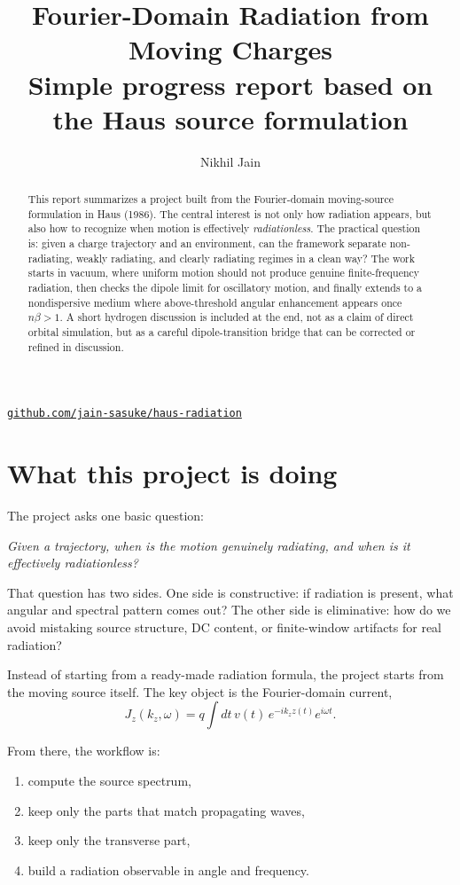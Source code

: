 \documentclass[11pt]{article}
\title{\textbf{Fourier-Domain Radiation from Moving Charges}\\[0.3em]
\large Simple progress report based on the Haus source formulation}
\author{Nikhil Jain}
\date{}
\begin{document}
\maketitle

\begin{center}
\href{https://github.com/jain-sasuke/haus-radiation}{\texttt{github.com/jain-sasuke/haus-radiation}}
\end{center}

\begin{abstract}
This report summarizes a project built from the Fourier-domain moving-source formulation in Haus (1986). The central interest is not only how radiation appears, but also how to recognize when motion is effectively \textit{radiationless}. The practical question is: given a charge trajectory and an environment, can the framework separate non-radiating, weakly radiating, and clearly radiating regimes in a clean way? The work starts in vacuum, where uniform motion should not produce genuine finite-frequency radiation, then checks the dipole limit for oscillatory motion, and finally extends to a nondispersive medium where above-threshold angular enhancement appears once $n\beta>1$. A short hydrogen discussion is included at the end, not as a claim of direct orbital simulation, but as a careful dipole-transition bridge that can be corrected or refined in discussion.
\end{abstract}

\section{What this project is doing}

The project asks one basic question:

\textit{Given a trajectory, when is the motion genuinely radiating, and when is it effectively radiationless?}

That question has two sides. One side is constructive: if radiation is present, what angular and spectral pattern comes out? The other side is eliminative: how do we avoid mistaking source structure, DC content, or finite-window artifacts for real radiation?

Instead of starting from a ready-made radiation formula, the project starts from the moving source itself. The key object is the Fourier-domain current,
\[
J_z(k_z,\omega)=q\int dt\, v(t)\, e^{-ik_z z(t)} e^{i\omega t}.
\]

From there, the workflow is:

\begin{enumerate}
    \item compute the source spectrum,
    \item keep only the parts that match propagating waves,
    \item keep only the transverse part,
    \item build a radiation observable in angle and frequency.
\end{enumerate}
\end{document}
